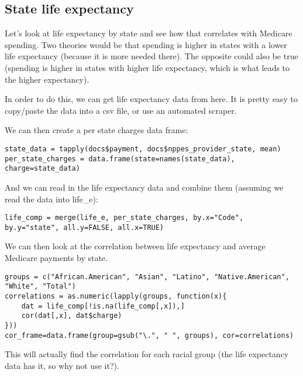 \newpage

\subsection*{State life expectancy}
Let's look at life expectancy by state and see how that correlates with Medicare spending. Two theories would be that spending is higher in states with a lower life expectancy (because it is more needed there). The opposite could also be true (spending is higher in states with higher life expectancy, which is what leads to the higher expectancy).

In order to do this, we can get life expectancy data from here. It is pretty easy to copy/paste the data into a csv file, or use an automated scraper.

We can then create a per state charges data frame:
\begin{framed}
\begin{verbatim}
state_data = tapply(docs$payment, docs$nppes_provider_state, mean)
per_state_charges = data.frame(state=names(state_data), charge=state_data)
\end{verbatim}
\end{framed}
And we can read in the life expectancy data and combine them (assuming we read the data into life_e):
\begin{framed}
\begin{verbatim}
life_comp = merge(life_e, per_state_charges, by.x="Code", by.y="state", all.y=FALSE, all.x=TRUE)

\end{verbatim}
\end{framed}
We can then look at the correlation between life expectancy and average Medicare payments by state.
\begin{framed}
\begin{verbatim}
groups = c("African.American", "Asian", "Latino", "Native.American", "White", "Total")
correlations = as.numeric(lapply(groups, function(x){
	dat = life_comp[!is.na(life_comp[,x]),]
	cor(dat[,x], dat$charge)
}))
cor_frame=data.frame(group=gsub("\.", " ", groups), cor=correlations)
\end{verbatim}
\end{framed}
This will actually find the correlation for each racial group (the life expectancy data has it, so why not use it?).

